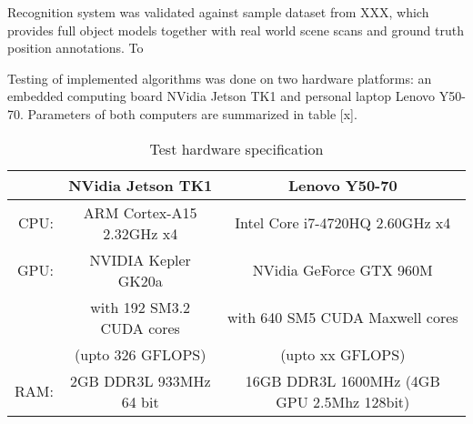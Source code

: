 


Recognition system was validated against sample dataset from XXX, which provides full object models together with real world scene scans and ground truth position annotations. To 



Testing of implemented algorithms was done on two hardware platforms: an embedded computing board NVidia Jetson TK1 and personal laptop Lenovo Y50-70. Parameters of both computers are summarized in table [x]. 

\begin{table}[H]
\centering
\begin{tabular}{r c | c}
& NVidia Jetson TK1 & Lenovo Y50-70 \\ 
 \hline
 CPU:& ARM Cortex-A15 2.32GHz x4 & Intel Core i7-4720HQ 2.60GHz x4\\
 GPU:& NVIDIA Kepler GK20a & NVidia GeForce GTX 960M \\
 &with 192 SM3.2 CUDA cores& with 640 SM5 CUDA Maxwell cores\\
 &(upto 326 GFLOPS)&(upto xx GFLOPS)\\
 RAM:& 2GB DDR3L 933MHz 64 bit&  16GB DDR3L 1600MHz (4GB GPU 2.5Mhz 128bit)
\end{tabular}
\caption{Test hardware specification}
\label{tab:hardware}
\end{table}



